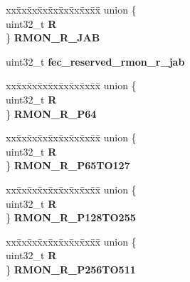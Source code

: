 \begin{DoxyCompactItemize}
\begin{tabbing}
\end{tabbing}\item 
\mbox{\label{structFEC__tag_a9461f7c977306068ae554943d65e55f7}} 
\begin{tabbing}
xx\=xx\=xx\=xx\=xx\=xx\=xx\=xx\=xx\=\kill
union \{\\
\>uint32\_t {\bfseries R}\\
\} {\bfseries RMON\_R\_JAB}\\

\end{tabbing}\item 
\mbox{\label{structFEC__tag_aa3d4431f74623ec263a1647a30e87a09}} 
uint32\+\_\+t {\bfseries fec\+\_\+reserved\+\_\+rmon\+\_\+r\+\_\+jab}
\item 
\mbox{\label{structFEC__tag_af67f1622bbf3ff58f7d4ae8d86ba0aee}} 
\begin{tabbing}
xx\=xx\=xx\=xx\=xx\=xx\=xx\=xx\=xx\=\kill
union \{\\
\>uint32\_t {\bfseries R}\\
\} {\bfseries RMON\_R\_P64}\\

\end{tabbing}\item 
\mbox{\label{structFEC__tag_a8e2d0311b5a541b3ff36e46a85d4802c}} 
\begin{tabbing}
xx\=xx\=xx\=xx\=xx\=xx\=xx\=xx\=xx\=\kill
union \{\\
\>uint32\_t {\bfseries R}\\
\} {\bfseries RMON\_R\_P65TO127}\\

\end{tabbing}\item 
\mbox{\label{structFEC__tag_a1596f811c7fd3c8ca93cdfd921ea16f2}} 
\begin{tabbing}
xx\=xx\=xx\=xx\=xx\=xx\=xx\=xx\=xx\=\kill
union \{\\
\>uint32\_t {\bfseries R}\\
\} {\bfseries RMON\_R\_P128TO255}\\

\end{tabbing}\item 
\mbox{\label{structFEC__tag_a6cea0080386eaf69bad3421aec5debda}} 
\begin{tabbing}
xx\=xx\=xx\=xx\=xx\=xx\=xx\=xx\=xx\=\kill
union \{\\
\>uint32\_t {\bfseries R}\\
\} {\bfseries RMON\_R\_P256TO511}\\


\end{tabbing}
\end{DoxyCompactItemize}
